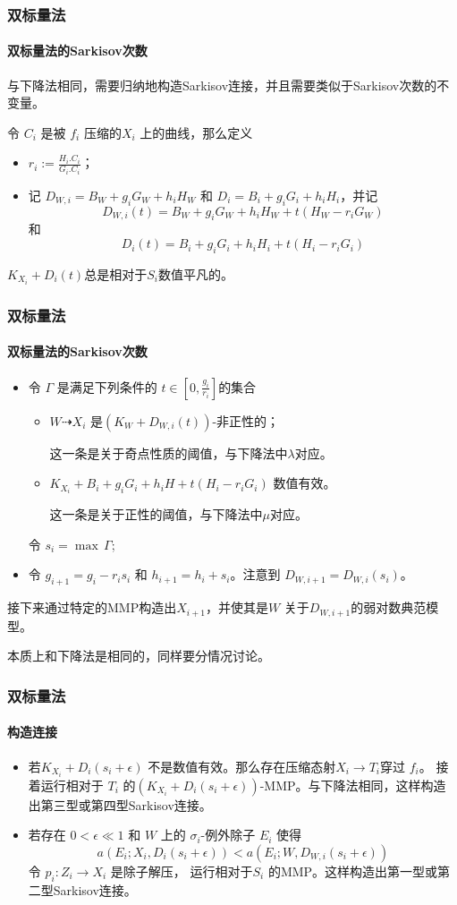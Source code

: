 \documentclass[10pt]{ctexbeamer}
\begin{document}
\begin{frame}[shrink]
  \frametitle{双标量法}
  \framesubtitle{双标量法的Sarkisov次数}
  与下降法相同，需要归纳地构造Sarkisov连接，并且需要类似于Sarkisov次数的不变量。

  \pause
  令 $C_{i}$ 是被 $f_{i}$ 压缩的$X_{i}$ 上的曲线，那么定义
  \begin{itemize}
    \item $r_{i}:=\frac{H_{i}.C_{i}}{G_{i}.C_{i}}$；
    \item 记 $D_{W,i}=B_{W}+g_{i}G_{W}+h_{i}H_{W}$ 和 $D_{i}=B_{i}+g_{i}G_{i}+h_{i}H_{i}$，并记
      \[D_{W,i}(t)=B_{W}+g_{i}G_{W}+h_{i}H_{W}+t(H_{W}-r_{i}G_{W})\]
      和
      \[D_{i}(t)=B_{i}+g_{i}G_{i}+h_{i}H_{i}+t (H_{i}-r_{i}G_{i})\]
  \end{itemize}
  \pause
  $K_{X_{i}}+D_{i}(t)$总是相对于$S_{i}$数值平凡的。
\end{frame}

\begin{frame}[shrink]
  \frametitle{双标量法}
  \framesubtitle{双标量法的Sarkisov次数}
  \begin{itemize}
    \item 令 $\Gamma$ 是满足下列条件的 $t\in [0,\frac{g_{i}}{r_{i}}] $的集合
      \begin{itemize}
        \item $W \dashrightarrow X_{i}$ 是$\left(K_{W}+D_{W,i}(t) \right)$-非正性的；

          \alert{这一条是关于奇点性质的阈值，与下降法中$\lambda$对应。} 
        \item $K_{X_{i}}+B_{i}+g_{i}G_i+h_{i}H+t(H_{i}-r_{i}G_{i})$  数值有效。

          \alert{这一条是关于正性的阈值，与下降法中$\mu$对应。}
      \end{itemize}
          令 $s_{i}=\max\, \Gamma $;
  \pause
    \item 令 $g_{i+1}=g_{i}-r_{i}s_{i}$ 和 $h_{i+1}=h_{i}+s_{i}$。注意到 $D_{W,i+1}=D_{W,i}(s_{i})$。
  \end{itemize}

  \pause
接下来通过特定的MMP构造出$X_{i+1} $，并使其是$W$ 关于$D_{W,i+1}$的弱对数典范模型。 

  \pause
  本质上和下降法是相同的，同样要分情况讨论。
\end{frame}

\begin{frame}[shrink]
  \frametitle{双标量法}
  \framesubtitle{构造连接}
  \begin{itemize}
    \item 
  若$K_{X_{i}}+D_{i}(s_{i}+\epsilon)$ 不是数值有效。那么存在压缩态射$X_{i}\to T_{i}$穿过 $f_{i}$。 
  接着运行相对于 $T_{i}$ 的$(K_{X_{i}}+D_{i}(s_{i}+\epsilon))$-MMP。与下降法相同，这样构造出第三型或第四型Sarkisov连接。
  \pause
    \item 
  若存在  $0<\epsilon \ll 1$ 和 $W$ 上的  $\sigma_{i}$-例外除子 $E_{i}$ 使得
  \[ a(E_{i};X_{i},D_{i}(s_{i}+\epsilon))< a(E_{i};W,D_{W,i}(s_{i}+\epsilon)) \]
  令 $p_{i}:Z_{i}\to X_{i}$ 是除子解压，
  运行相对于$S_{i}$ 的MMP。这样构造出第一型或第二型Sarkisov连接。
  \end{itemize}
\end{frame}
\end{document}
